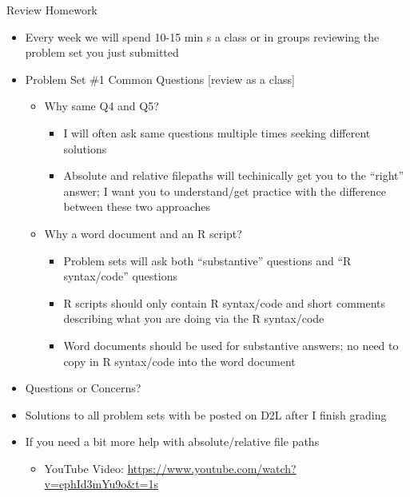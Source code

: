\documentclass[
  8pt,
  ignorenonframetext,
  dvipsnames]{beamer}
\providecommand{\tightlist}{%
  \setlength{\itemsep}{0pt}\setlength{\parskip}{0pt}}
\let\olditem\item
\renewcommand{\item}{%
  \olditem\vspace{4pt}
}
\begin{document}
\begin{frame}{Review Homework}
\protect\hypertarget{review-homework}{}

\begin{itemize}
\tightlist
\item
  Every week we will spend 10-15 min s a class or in groups reviewing
  the problem set you just submitted
\item
  Problem Set \#1 Common Questions {[}review as a class{]}

  \begin{itemize}
  \tightlist
  \item
    Why same Q4 and Q5?

    \begin{itemize}
    \tightlist
    \item
      I will often ask same questions multiple times seeking different
      solutions
    \item
      Absolute and relative filepaths will techinically get you to the
      ``right'' answer; I want you to understand/get practice with the
      difference between these two approaches
    \end{itemize}
  \item
    Why a word document and an R script?

    \begin{itemize}
    \tightlist
    \item
      Problem sets will ask both ``substantive'' questions and ``R
      syntax/code'' questions
    \item
      R scripts should only contain R syntax/code and short comments
      describing what you are doing via the R syntax/code
    \item
      Word documents should be used for substantive answers; no need to
      copy in R syntax/code into the word document
    \end{itemize}
  \end{itemize}
\item
  Questions or Concerns?
\item
  Solutions to all problem sets with be posted on D2L after I finish
  grading
\item
  If you need a bit more help with absolute/relative file paths

  \begin{itemize}
  \tightlist
  \item
    YouTube Video:
    \url{https://www.youtube.com/watch?v=ephId3mYu9o\&t=1s}
  \end{itemize}
\end{itemize}

\end{frame}
\end{document}
